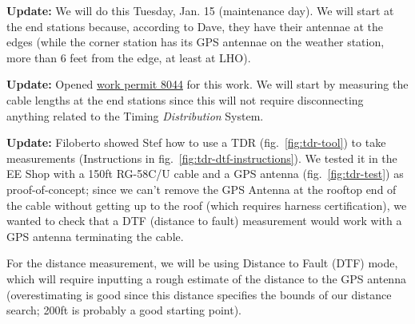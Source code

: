 \documentclass{article}
\begin{document}
\textbf{Update:} We will do this Tuesday, Jan. 15 (maintenance day). We will start at the end stations because, according to Dave, they have their antennae at the edges (while the corner station has its GPS antennae on the weather station, more than 6 feet from the edge, at least at LHO).

\textbf{Update:} Opened \href{https://services.ligo-la.caltech.edu/LHO/workpermits/view.php?permit_id=8044}{work permit 8044} for this work. We will start by measuring the cable lengths at the end stations since this will not require disconnecting anything related to the Timing \textit{Distribution} System.

\textbf{Update:} Filoberto showed Stef how to use a TDR (fig.~\ref{fig:tdr-tool}) to take measurements (Instructions in fig.~\ref{fig:tdr-dtf-instructions}). We tested it in the EE Shop with a 150ft RG-58C/U cable and a GPS antenna (fig.~\ref{fig:tdr-test}) as proof-of-concept; since we can't remove the GPS Antenna at the rooftop end of the cable without getting up to the roof (which requires harness certification), we wanted to check that a DTF (distance to fault) measurement would work with a GPS antenna terminating the cable.

For the distance measurement, we will be using Distance to Fault (DTF) mode, which will require inputting a rough estimate of the distance to the GPS antenna (overestimating is good since this distance specifies the bounds of our distance search; 200ft is probably a good starting point). 
\end{document}
